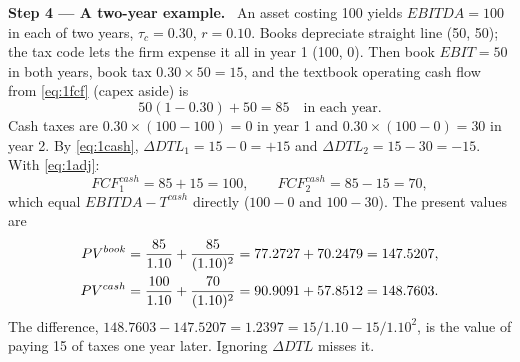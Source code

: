 \documentclass[11pt,a4paper]{article}
\numberwithin{equation}{section}
\newcommand{\step}[2]{\par\medskip\noindent\textbf{Step #1 --- #2.}~}
\begin{document}
\step{4}{A two-year example} An asset costing 100 yields $EBITDA=100$ in each of two years,
$\tau_c=0.30$, $r=0.10$. Books depreciate straight line (50, 50); the tax code lets the firm
expense it all in year 1 (100, 0). Then book $EBIT=50$ in both years, book tax $0.30\times50=15$,
and the textbook operating cash flow from \eqref{eq:1fcf} (capex aside) is
\begin{equation}\label{eq:1ex85}
  50(1-0.30) + 50 = 85 \quad\text{in each year.}
\end{equation}
Cash taxes are $0.30\times(100-100)=0$ in year 1 and $0.30\times(100-0)=30$ in year 2. By
\eqref{eq:1cash}, $\Delta DTL_1 = 15-0 = +15$ and $\Delta DTL_2 = 15-30 = -15$. With \eqref{eq:1adj}:
\begin{equation}\label{eq:1ex100}
  FCF^{cash}_1 = 85 + 15 = 100, \qquad FCF^{cash}_2 = 85 - 15 = 70,
\end{equation}
which equal $EBITDA - T^{cash}$ directly ($100-0$ and $100-30$). The present values are
\begin{align}
  PV^{book} &= \frac{85}{1.10} + \frac{85}{(1.10)^2} = 77.2727 + 70.2479 = 147.5207, \notag\\
  PV^{cash} &= \frac{100}{1.10} + \frac{70}{(1.10)^2} = 90.9091 + 57.8512 = 148.7603. \label{eq:1expv}
\end{align}
The difference, $148.7603-147.5207=1.2397 = 15/1.10 - 15/1.10^2$, is the value of paying 15 of
taxes one year later. Ignoring $\Delta DTL$ misses it.
\end{document}
